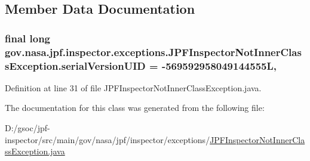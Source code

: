 \subsection{Member Data Documentation}
\subsubsection[{\texorpdfstring{serial\+Version\+U\+ID}{serialVersionUID}}]{\setlength{\rightskip}{0pt plus 5cm}final long gov.\+nasa.\+jpf.\+inspector.\+exceptions.\+J\+P\+F\+Inspector\+Not\+Inner\+Class\+Exception.\+serial\+Version\+U\+ID = -\/569592958049144555L\hspace{0.3cm}{\ttfamily [static]}, {\ttfamily [private]}}\hypertarget{classgov_1_1nasa_1_1jpf_1_1inspector_1_1exceptions_1_1_j_p_f_inspector_not_inner_class_exception_a1d488cbbba8b6e58ff4a3b7c46a7f2a5}{}\label{classgov_1_1nasa_1_1jpf_1_1inspector_1_1exceptions_1_1_j_p_f_inspector_not_inner_class_exception_a1d488cbbba8b6e58ff4a3b7c46a7f2a5}


Definition at line 31 of file J\+P\+F\+Inspector\+Not\+Inner\+Class\+Exception.\+java.



The documentation for this class was generated from the following file\+:\begin{DoxyCompactItemize}
\item 
D\+:/gsoc/jpf-\/inspector/src/main/gov/nasa/jpf/inspector/exceptions/\hyperlink{_j_p_f_inspector_not_inner_class_exception_8java}{J\+P\+F\+Inspector\+Not\+Inner\+Class\+Exception.\+java}\end{DoxyCompactItemize}
